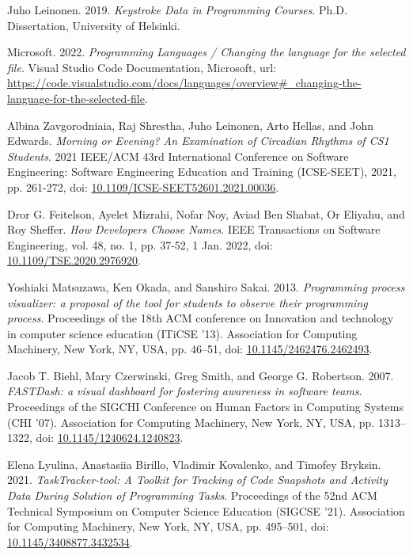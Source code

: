 \begin{thebibliography}{99}
 Juho Leinonen. 2019. \textit{Keystroke Data in Programming Courses}. Ph.D. Dissertation, University of Helsinki.

 Microsoft. 2022. \textit{Programming Languages / Changing the language for the selected file}. Visual Studio Code Documentation, Microsoft, url: \url{https://code.visualstudio.com/docs/languages/overview#_changing-the-language-for-the-selected-file}.

 Albina Zavgorodniaia, Raj Shrestha, Juho Leinonen, Arto Hellas, and John Edwards. \textit{Morning or Evening? An Examination of Circadian Rhythms of CS1 Students}. 2021 IEEE/ACM 43rd International Conference on Software Engineering: Software Engineering Education and Training (ICSE-SEET), 2021, pp. 261-272, doi: \href{https://doi.org/10.1109/ICSE-SEET52601.2021.00036}{10.1109/ICSE-SEET52601.2021.00036}.

 Dror G. Feitelson, Ayelet Mizrahi, Nofar Noy, Aviad Ben Shabat, Or Eliyahu, and Roy Sheffer. \textit{How Developers Choose Names}. IEEE Transactions on Software Engineering, vol. 48, no. 1, pp. 37-52, 1 Jan. 2022, doi: \href{https://doi.org/10.1109/TSE.2020.2976920}{10.1109/TSE.2020.2976920}.

 Yoshiaki Matsuzawa, Ken Okada, and Sanshiro Sakai. 2013. \textit{Programming process visualizer: a proposal of the tool for students to observe their programming process}. Proceedings of the 18th ACM conference on Innovation and technology in computer science education (ITiCSE '13). Association for Computing Machinery, New York, NY, USA, pp. 46–51, doi: \href{https://doi.org/10.1145/2462476.2462493}{10.1145/2462476.2462493}.

 Jacob T. Biehl, Mary Czerwinski, Greg Smith, and George G. Robertson. 2007. \textit{FASTDash: a visual dashboard for fostering awareness in software teams}. Proceedings of the SIGCHI Conference on Human Factors in Computing Systems (CHI '07). Association for Computing Machinery, New York, NY, USA, pp. 1313–1322, doi: \href{https://doi.org/10.1145/1240624.1240823}{10.1145/1240624.1240823}.

 Elena Lyulina, Anastasiia Birillo, Vladimir Kovalenko, and Timofey Bryksin. 2021. \textit{TaskTracker-tool: A Toolkit for Tracking of Code Snapshots and Activity Data During Solution of Programming Tasks}. Proceedings of the 52nd ACM Technical Symposium on Computer Science Education (SIGCSE '21). Association for Computing Machinery, New York, NY, USA, pp. 495–501, doi: \href{https://doi.org/10.1145/3408877.3432534}{10.1145/3408877.3432534}.


\end{thebibliography}
